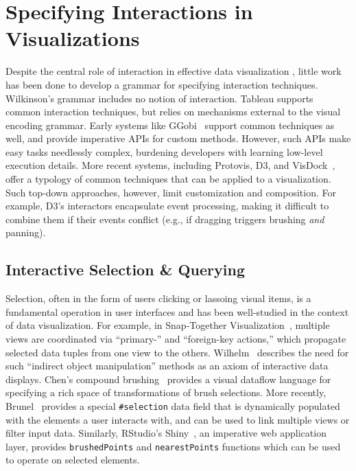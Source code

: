 \section{Specifying Interactions in Visualizations}

Despite the central role of interaction in effective data visualization
\cite{heer:dynamics, pike:interactionscience}, little work has been done to
develop a grammar for specifying interaction techniques. Wilkinson's grammar
includes no notion of interaction. Tableau supports common interaction
techniques, but relies on mechanisms external to the visual encoding grammar.
Early systems like GGobi~\cite{swayne:ggobi} support common techniques as well,
and provide imperative APIs for custom methods. However, such APIs make easy
tasks needlessly complex, burdening developers with learning low-level execution
details. More recent systems, including Protovis, D3, and
VisDock~\cite{choi:visdock}, offer a typology of common techniques that can be
applied to a visualization. Such top-down approaches, however, limit
customization and composition. For example, D3's interactors encapsulate event
processing, making it difficult to combine them if their events conflict (e.g.,
if dragging triggers brushing \emph{and} panning).

\subsection{Interactive Selection \& Querying}

Selection, often in the form of users clicking or lassoing visual items, is a
fundamental operation in user interfaces and has been well-studied in the
context of data visualization. For example, in Snap-Together
Visualization~\cite{north:snap}, multiple views are coordinated via ``primary-''
and ``foreign-key actions,'' which propagate selected data tuples from one view
to the others. Wilhelm~\cite{wilhelm:interaction} describes the need for such
``indirect object manipulation'' methods as an axiom of interactive data
displays. Chen's compound brushing~\cite{chen:compound} provides a visual
dataflow language for specifying a rich space of transformations of brush
selections.  More recently, Brunel~\cite{brunel} provides a special
\texttt{\#selection} data field that is dynamically populated with the elements
a user interacts with, and can be used to link multiple views or filter input
data. Similarly, RStudio's Shiny~\cite{shiny}, an imperative web application
layer, provides \texttt{brushedPoints} and \texttt{nearestPoints} functions
which can be used to operate on selected elements.

